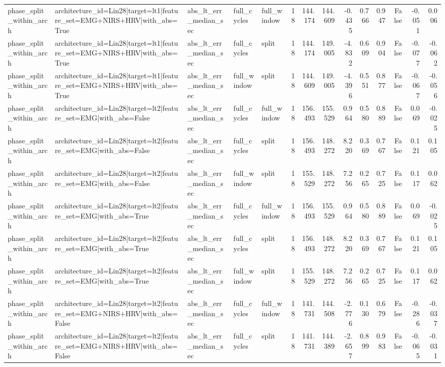 \begin{table}
\begin{tabular}{lllllrrrrrrrrr}
phase_split_within_arch & architecture_id=Lin28|target=lt1|feature_set=EMG+NIRS+HRV|with_abs=True & abs_lt_err_median_sec & full_cycles & full_window & 18 & 144.174 & 144.609 & -0.435 & 0.766 & 0.947 & False & -0.051 & 0.006 \\
phase_split_within_arch & architecture_id=Lin28|target=lt1|feature_set=EMG+NIRS+HRV|with_abs=True & abs_lt_err_median_sec & full_cycles & split & 18 & 144.174 & 149.005 & -4.832 & 0.609 & 0.904 & False & -0.077 & -0.062 \\
phase_split_within_arch & architecture_id=Lin28|target=lt1|feature_set=EMG+NIRS+HRV|with_abs=True & abs_lt_err_median_sec & full_window & split & 18 & 144.609 & 149.005 & -4.396 & 0.551 & 0.877 & False & -0.067 & -0.056 \\
phase_split_within_arch & architecture_id=Lin28|target=lt2|feature_set=EMG|with_abs=False & abs_lt_err_median_sec & full_cycles & full_window & 18 & 156.493 & 155.529 & 0.964 & 0.580 & 0.889 & False & 0.069 & -0.025 \\
phase_split_within_arch & architecture_id=Lin28|target=lt2|feature_set=EMG|with_abs=False & abs_lt_err_median_sec & full_cycles & split & 18 & 156.493 & 148.272 & 8.220 & 0.369 & 0.767 & False & 0.121 & 0.105 \\
phase_split_within_arch & architecture_id=Lin28|target=lt2|feature_set=EMG|with_abs=False & abs_lt_err_median_sec & full_window & split & 18 & 155.529 & 148.272 & 7.256 & 0.265 & 0.725 & False & 0.117 & 0.062 \\
phase_split_within_arch & architecture_id=Lin28|target=lt2|feature_set=EMG|with_abs=True & abs_lt_err_median_sec & full_cycles & full_window & 18 & 156.493 & 155.529 & 0.964 & 0.580 & 0.889 & False & 0.069 & -0.025 \\
phase_split_within_arch & architecture_id=Lin28|target=lt2|feature_set=EMG|with_abs=True & abs_lt_err_median_sec & full_cycles & split & 18 & 156.493 & 148.272 & 8.220 & 0.369 & 0.767 & False & 0.121 & 0.105 \\
phase_split_within_arch & architecture_id=Lin28|target=lt2|feature_set=EMG|with_abs=True & abs_lt_err_median_sec & full_window & split & 18 & 155.529 & 148.272 & 7.256 & 0.265 & 0.725 & False & 0.117 & 0.062 \\
phase_split_within_arch & architecture_id=Lin28|target=lt2|feature_set=EMG+NIRS+HRV|with_abs=False & abs_lt_err_median_sec & full_cycles & full_window & 18 & 141.731 & 144.508 & -2.776 & 0.130 & 0.679 & False & -0.286 & -0.037 \\
phase_split_within_arch & architecture_id=Lin28|target=lt2|feature_set=EMG+NIRS+HRV|with_abs=False & abs_lt_err_median_sec & full_cycles & split & 18 & 141.731 & 144.389 & -2.657 & 0.899 & 0.983 & False & -0.065 & -0.031 \\

\end{tabular}
\end{table}
